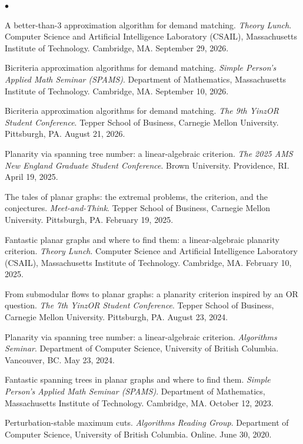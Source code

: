 \documentclass[margin,line]{res}
\newenvironment{list2}{
  \begin{list}{$\bullet$}{%
      \setlength{\itemsep}{0in}
      \setlength{\parsep}{0in} \setlength{\parskip}{0in}
      \setlength{\topsep}{0in} \setlength{\partopsep}{0in}
      \setlength{\leftmargin}{0.2in}}}{\end{list}}
\begin{document}
\begin{resume}
\begin{list2}
\item[$\circ$] A better-than-$3$ approximation algorithm for demand matching. \emph{Theory Lunch}. Computer Science and Artificial Intelligence Laboratory (CSAIL), Massachusetts Institute of Technology. Cambridge, MA. September 29, 2026.
\item[$\circ$] Bicriteria approximation algorithms for demand matching. \emph{Simple Person's Applied Math Seminar (SPAMS)}. Department of Mathematics, Massachusetts Institute of Technology. Cambridge, MA. September 10, 2026.
\item[$\circ$] Bicriteria approximation algorithms for demand matching. \emph{The 9th YinzOR Student Conference}. Tepper School of Business, Carnegie Mellon University. Pittsburgh, PA. August 21, 2026.
\item[$\circ$] Planarity via spanning tree number: a linear-algebraic criterion. \emph{The 2025 AMS New England Graduate Student Conference}. Brown University. Providence, RI. April 19, 2025.
\item[$\circ$] The tales of planar graphs: the extremal problems, the criterion, and the conjectures. \emph{Meet-and-Think}. Tepper School of Business, Carnegie Mellon University. Pittsburgh, PA. February 19, 2025.
\item[$\circ$] Fantastic planar graphs and where to find them: a linear-algebraic planarity criterion. \emph{Theory Lunch}. Computer Science and Artificial Intelligence Laboratory (CSAIL), Massachusetts Institute of Technology. Cambridge, MA. February 10, 2025.
\item[$\circ$] From submodular flows to planar graphs: a planarity criterion inspired by an OR question. \emph{The 7th YinzOR Student Conference}. Tepper School of Business, Carnegie Mellon University. Pittsburgh, PA. August 23, 2024.
\item[$\circ$] Planarity via spanning tree number: a linear-algebraic criterion. \emph{Algorithms Seminar}. Department of Computer Science, University of British Columbia. Vancouver, BC. May 23, 2024.
\item[$\circ$] Fantastic spanning trees in planar graphs and where to find them. \emph{Simple Person's Applied Math Seminar (SPAMS)}. Department of Mathematics, Massachusetts Institute of Technology. Cambridge, MA. October 12, 2023.
\item[$\circ$] Perturbation-stable maximum cuts. \emph{Algorithms Reading Group}. Department of Computer Science, University of British Columbia. Online. June 30, 2020.
\end{list2}



\end{resume}
\end{document}

